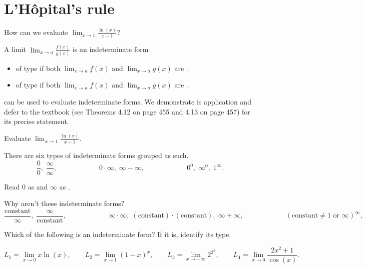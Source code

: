 \documentclass[../main.tex]{subfiles}
\begin{document}
 \section{L'H\^opital's rule}
  How can we evaluate \(\lim_{x \to 1} \frac{\ln(x)}{x - 1}\)?

  A limit \(\lim_{x \to a} \frac{f(x)}{g(x)}\) is an indeterminate form 
  \begin{itemize}
    \item of type \underline{\hspace{1in}} if both \(\lim_{x \to a} f(x)\) and \(\lim_{x \to a} g(x)\) are \underline{\hspace{1in}}.
    \item of type \underline{\hspace{1in}} if both \(\lim_{x \to a} f(x)\) and \(\lim_{x \to a} g(x)\) are \underline{\hspace{1in}}.
  \end{itemize}
   can be used to evaluate indeterminate forms. We demonstrate is application and defer to the textbook (see Theorems 4.12 on page 455 and 4.13 on page 457) for its precise statement.
  
  \begin{example}
    Evaluate \(\lim_{x \to 1} \frac{\ln(x)}{x - 1}\).
  \end{example}

  There are six types of indeterminate forms grouped as such.
  \[
    \frac{0}{0},\; \frac{\infty}{\infty}, \hspace{1in} 0 \cdot \infty,\; \infty - \infty, \hspace{1in} 0^{0}, \; \infty^{0}, \; 1^{\infty}.
  \]

  Read \(0\) as \underline{\hspace{3in}} and \(\infty\) as \underline{\hspace{3in}}. 

  Why aren't these indeterminate forms?
  \[
    \frac{\text{constant}}{\infty},\; \frac{\infty}{\text{constant}}, \hspace{1in} \infty \cdot \infty,\; (\text{constant}) \cdot (\text{constant}),\; \infty + \infty, \hspace{1in} (\text{constant} \ne 1 \text{ or } \infty)^{\infty}, 
  \]
  
  \begin{example}
    Which of the following is an indeterminate form? If it is, identify its type. 

    \[
      L_{1} = \lim_{x \to 0} x \ln(x),
      \qquad
      L_{2} = \lim_{x \to 1} (1-x)^{x},
      \qquad
      L_{3} = \lim_{x \to -\infty} 2^{2^{x}},
      \qquad
      L_{4} = \lim_{x \to 0} \frac{2x^{2}+1}{\cos(x)}.
    \]
  \end{example}
\end{document}
